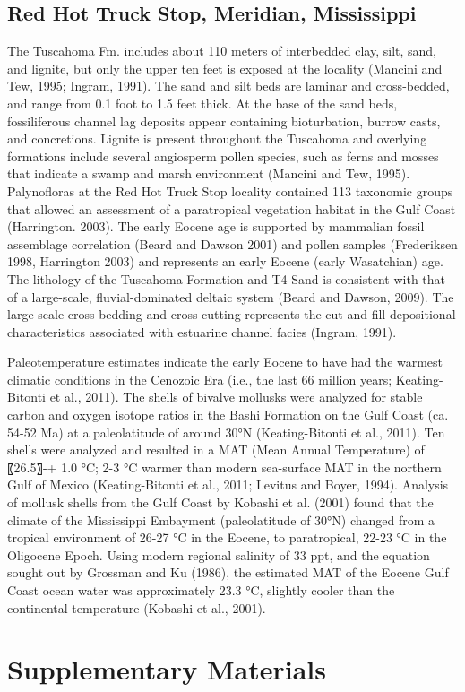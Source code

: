 \documentclass[]{rsos}%
\begin{document}
\subsection{Red Hot Truck Stop, Meridian, Mississippi}
The Tuscahoma Fm. includes about 110 meters of interbedded clay, silt, sand, and lignite, but only the upper ten feet is exposed at the locality (Mancini and Tew, 1995; Ingram, 1991). 
The sand and silt beds are laminar and cross-bedded, and range from 0.1 foot to 1.5 feet thick. At the base of the sand beds, fossiliferous channel lag deposits appear containing bioturbation, burrow casts, and concretions. 
Lignite is present throughout the Tuscahoma and overlying formations include several angiosperm pollen species, such as ferns and mosses that indicate a swamp and marsh environment (Mancini and Tew, 1995).
Palynofloras at the Red Hot Truck Stop locality contained 113 taxonomic groups that allowed an assessment of a paratropical vegetation habitat in the Gulf Coast (Harrington. 2003).
The early Eocene age is supported by mammalian fossil assemblage correlation (Beard and Dawson 2001) and pollen samples (Frederiksen 1998, Harrington 2003) and represents an early Eocene (early Wasatchian) age. 
The lithology of the Tuscahoma Formation and T4 Sand is consistent with that of a large-scale, fluvial-dominated deltaic system (Beard and Dawson, 2009). 
The large-scale cross bedding and cross-cutting represents the cut-and-fill depositional characteristics associated with estuarine channel facies (Ingram, 1991). 

Paleotemperature estimates indicate the early Eocene to have had the warmest climatic conditions in the Cenozoic Era (i.e., the last 66 million years; Keating-Bitonti et al., 2011). 
The shells of bivalve mollusks were analyzed for stable carbon and oxygen isotope ratios in the Bashi Formation on the Gulf Coast (ca. 54-52 Ma) at a paleolatitude of around 30°N (Keating-Bitonti et al., 2011). 
Ten shells were analyzed and resulted in a MAT (Mean Annual Temperature) of 〖26.5〗-+ 1.0 °C; 2-3 °C warmer than modern sea-surface MAT in the northern Gulf of Mexico (Keating-Bitonti et al., 2011; Levitus and Boyer, 1994). 
Analysis of mollusk shells from the Gulf Coast by Kobashi et al. (2001) found that the climate of the Mississippi Embayment (paleolatitude of 30°N) changed from a tropical environment of 26-27 °C in the Eocene, to paratropical, 22-23 °C in the Oligocene Epoch. 
Using modern regional salinity of 33 ppt, and the equation sought out by Grossman and Ku (1986), the estimated MAT of the Eocene Gulf Coast ocean water was approximately 23.3 °C, slightly cooler than the continental temperature (Kobashi et al., 2001). 

\pagebreak




\clearpage
\section{Supplementary Materials}
\end{document}
